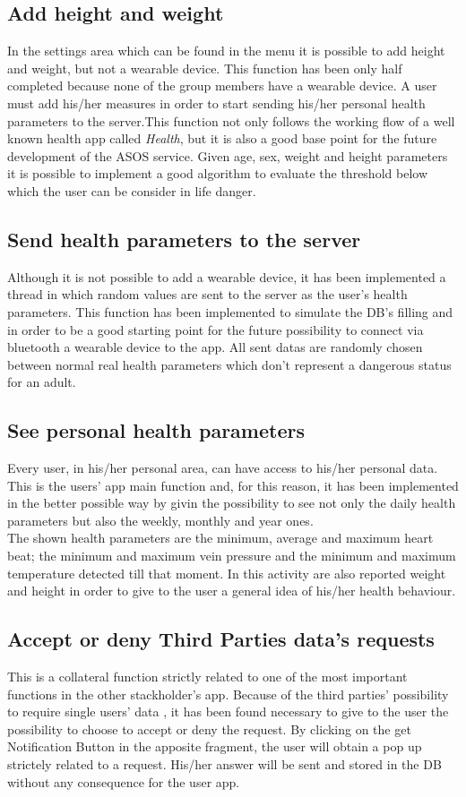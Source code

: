 \subsection{Add height and weight}
In the settings area which can be found in the menu it is possible to add height and weight, but not a wearable device. This function has been only half completed because none of the group members have a wearable device. A user must add his/her measures in order to start sending his/her personal health parameters to the server.This function not only follows the working flow of a well known health app called \textit{Health}, but it is also a good base point for the future development of the ASOS service. Given age, sex, weight and height parameters it is possible to implement a good algorithm to evaluate the threshold below which the user can be consider in life danger.

\subsection{Send health parameters to the server}
Although it is not possible to add a wearable device, it has been implemented a thread in which random values are sent to the server as the user's health parameters. This function has been implemented to simulate the DB's filling and in order to be a good starting point for the future possibility to connect via bluetooth a wearable device to the app. All sent datas are randomly chosen between normal  real health parameters which don't represent a dangerous status for an adult.

\subsection{See personal health parameters}
Every user, in his/her personal area, can have access to his/her personal data. This is the users' app main function and, for this reason, it has been implemented in the better possible way by givin the possibility to see not only the daily health parameters but also the weekly, monthly and year ones. \\ The shown health parameters are the minimum, average and maximum heart beat; the minimum and maximum vein pressure and the minimum and maximum temperature detected till that moment. In this activity are also reported weight and height in order to give to the user a general idea of his/her health behaviour.

\subsection{Accept or deny Third Parties data's requests}
This is a collateral function strictly related to one of the most important functions in the other stackholder's app. Because of the third parties' possibility to require single users' data , it has been found necessary to give to the user the possibility to choose to accept or deny the request. By clicking on the get Notification Button in the apposite fragment, the user will obtain a pop up strictely related to a request. His/her answer will be sent and stored in the DB without any consequence for the user app.
